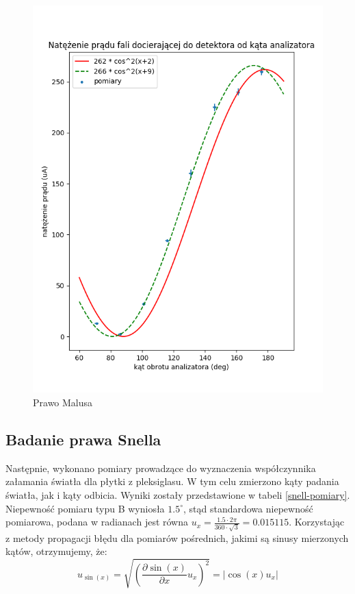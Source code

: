 \documentclass[a4paper]{article}
\newlength{\du}
\begin{document}
\begin{figure}[h]
\centering
\includegraphics[scale=0.6]{malus.png}
\caption{Prawo Malusa}
\label{malus-wykres}
\end{figure}


\subsection{Badanie prawa Snella}
Następnie, wykonano pomiary prowadzące do wyznaczenia współczynnika załamania światła dla płytki z pleksiglasu.
W tym celu zmierzono kąty padania światła, jak i kąty odbicia.
Wyniki zostały przedstawione w tabeli \ref{snell-pomiary}.
Niepewność pomiaru typu B wyniosła $1.5^\circ$, stąd standardowa niepewność pomiarowa, podana w radianach jest równa $u_x = \frac{1.5 \cdot 2 \pi}{360 \cdot \sqrt{3}} = 0.015115$.
Korzystając z metody propagacji błędu dla pomiarów pośrednich, jakimi są sinusy mierzonych kątów, otrzymujemy, że:
\[
	u_{\sin(x)} = \sqrt{\left(\frac{\partial \sin(x)}{\partial x}u_{x}\right)^2} = \left|\cos(x)u_{x}\right|
\]
\end{document}
